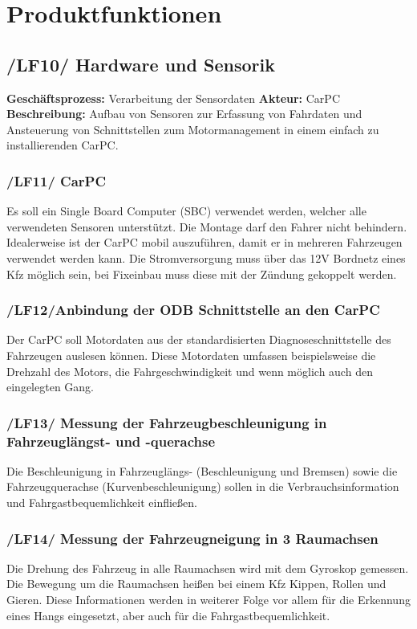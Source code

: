 \chapter{Produktfunktionen}
\section{/LF10/ Hardware und Sensorik}
\textbf{Geschäftsprozess:}	Verarbeitung der Sensordaten
\newline
\textbf{Akteur:}			CarPC
\newline
\textbf{Beschreibung:}	Aufbau von Sensoren zur Erfassung von Fahrdaten und Ansteuerung von Schnittstellen zum Motormanagement in einem einfach zu installierenden CarPC.

\subsection{/LF11/ CarPC}
\nextline
Es soll ein Single Board Computer (SBC) verwendet werden, welcher alle verwendeten Sensoren unterstützt. Die Montage darf den Fahrer nicht behindern. Idealerweise ist der CarPC mobil auszuführen, damit er in mehreren Fahrzeugen verwendet werden kann. Die Stromversorgung muss über das 12V Bordnetz eines Kfz möglich sein, bei Fixeinbau muss diese mit der Zündung gekoppelt werden.

\subsection{/LF12/Anbindung der ODB Schnittstelle an den CarPC}
\nextline
Der CarPC soll Motordaten aus der standardisierten Diagnoseschnittstelle des Fahrzeugen auslesen können. Diese Motordaten umfassen beispielsweise die Drehzahl des Motors, die Fahrgeschwindigkeit und wenn möglich auch den eingelegten Gang.

\subsection{/LF13/ Messung der Fahrzeugbeschleunigung in Fahrzeuglängst- und -querachse}
\nextline
Die Beschleunigung in Fahrzeuglängs- (Beschleunigung und Bremsen) sowie die Fahrzeugquerachse (Kurvenbeschleunigung) sollen in die Verbrauchsinformation und Fahrgastbequemlichkeit einfließen.

\subsection{/LF14/ Messung der Fahrzeugneigung in 3 Raumachsen}
\nextline
Die Drehung des Fahrzeug in alle Raumachsen wird mit dem Gyroskop gemessen. Die Bewegung um die Raumachsen heißen bei einem Kfz Kippen, Rollen und Gieren. Diese Informationen werden in weiterer Folge vor allem für die Erkennung eines Hangs eingesetzt, aber auch für die Fahrgastbequemlichkeit.

